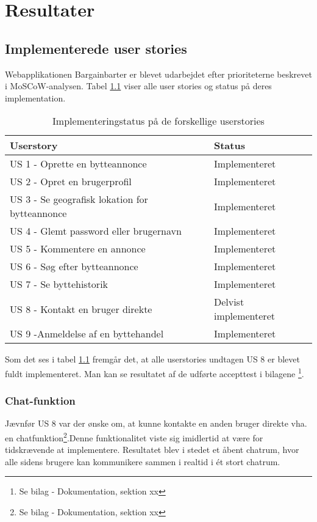 \chapter{Resultater}\label{ch:Resultat og Diskussion}
\section{Implementerede user stories}
Webapplikationen Bargainbarter er blevet udarbejdet efter prioriteterne beskrevet i MoSCoW-analysen. Tabel \ref{fig:Implementeringsstatus} viser alle user stories og status på deres implementation.

\begin{table}[H]
	\begin{tabular}{ | l | p{5cm} |}
		\hline
		\textbf{Userstory}  & \textbf{Status} \\ \hline
		US 1 - Oprette en bytteannonce  & Implementeret \\ \hline
		US 2 - Opret en brugerprofil & Implementeret \\ \hline
		US 3 - Se geografisk lokation for bytteannonce & Implementeret \\ \hline
		US 4 - Glemt password eller brugernavn & Implementeret \\ \hline
		US 5 - Kommentere en annonce & Implementeret \\ \hline
		US 6 - Søg efter bytteannonce & Implementeret \\ \hline
		US 7 - Se byttehistorik & Implementeret \\ \hline	
		US 8 - Kontakt en bruger direkte & Delvist implementeret \\ \hline	
		US 9 -Anmeldelse af en byttehandel & Implementeret \\ \hline	
	\end{tabular}
\caption{Implementeringstatus på de forskellige userstories}
\label{fig:Implementeringsstatus}
\end{table}

Som det ses i tabel \ref{fig:Implementeringsstatus} fremgår det, at alle userstories undtagen  US 8 er blevet fuldt implementeret. Man kan se resultatet af de udførte accepttest i bilagene \footnote{Se bilag - Dokumentation, sektion xx}.

\subsection{Chat-funktion}
Jævnfør US 8 var der ønske om, at kunne kontakte en anden bruger direkte vha. en chatfunktion\footnote{Se bilag - Dokumentation, sektion xx}.Denne funktionalitet viste sig imidlertid at være for tidskrævende at implementere. Resultatet blev i stedet et åbent chatrum, hvor alle sidens brugere kan kommunikere sammen i realtid i ét stort chatrum. 


